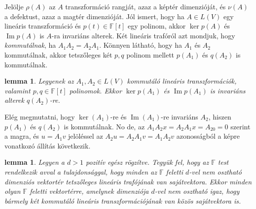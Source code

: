 \documentclass[a4paper, showtrims]{memoir}
\makeatletter
\renewenvironment{proof}[1][\proofname]
    {\par\pushQED{\qed}%
    \normalfont \topsep6\p@\@plus6\p@\relax
    \trivlist
    \item[\hskip\labelsep
        \itshape
    #1\@addpunct{:}]\ignorespaces}
    {\popQED\endtrivlist\@endpefalse}
\theoremstyle{plain}
\newtheorem{lemma}[proposition]{lemma}
\theoremstyle{remark}
\theoremstyle{definition}
\DeclareMathOperator{\im}{Im}
\makeatother
\begin{document}
Jelölje $\rho\left( A \right)$ az $A$ transzformáció rangját,
azaz a képtér dimenzióját,
és $\nu\left( A \right)$ a defektust, azaz a magtér dimenzióját.
Jól ismert, hogy ha $A\in L\left( V \right)$ egy lineáris transzformáció
és $p\left( t \right)\in\mathbb{F}\left[ t \right]$ egy polinom, akkor
$\ker p\left( A \right)$ és
$\im p\left( A \right)$ is $A$-ra invariáns alterek.
Két lineáris trafóról azt mondjuk, hogy \emph{kommutálnak},
ha $A_1A_2=A_2A_1.$
Könnyen látható, hogy ha $A_1$ és $A_2$ kommutálnak, akkor tetszőleges két $p,q$
polinom mellett $p\left( A_1 \right)$ és $q\left( A_2 \right)$ is kommutálnak.
\begin{lemma}
	Legyenek az $A_1,A_2\in L\left( V \right)$ kommutáló lineáris transzformációk,
	valamint $p,q\in\mathbb{F}\left[ t \right]$ polinomok.
	Ekkor $\ker p\left( A_1 \right)$ és
	$\im p\left( A_1 \right)$ is invariáns alterek $q\left( A_2 \right)$-re.
\end{lemma}
\begin{proof}
	Elég megmutatni, hogy $\ker\left( A_1 \right)$-re és
	$\im\left( A_1 \right)$-re invariáns $A_2$, hiszen $p\left( A_1 \right)$
	és $q\left( A_2 \right)$ is kommutálnak.
	No de, az
	\(
	A_1 A_2 x=A_2A_1x=A_20=0
	\)
	szerint a magra,
	és $u=A_1v$ jelöléssel az
	\(
	A_2u=A_2 A_1v =A_1A_2v
	\)
	azonosságból a képre vonatkozó állítás következik.
\end{proof}
\begin{lemma}
	\label{le:indukcio}
	Legyen a $d>1$ pozitív egész rögzítve.
	Tegyük fel, hogy az $\mathbb{F}$ test rendelkezik avval a tulajdonsággal,
	hogy minden az $\mathbb{F}$ feletti $d$-vel nem osztható dimenziós vektortér tetszőleges
	lineáris trafójának van sajátvektora.
	Ekkor minden olyan $\mathbb{F}$ feletti vektortérre,
	amelynek dimenziója $d$-vel nem osztható igaz,
	hogy bármely két kommutáló lineáris transzformációjának van közös sajátvektora is.
\end{lemma}
\end{document}
